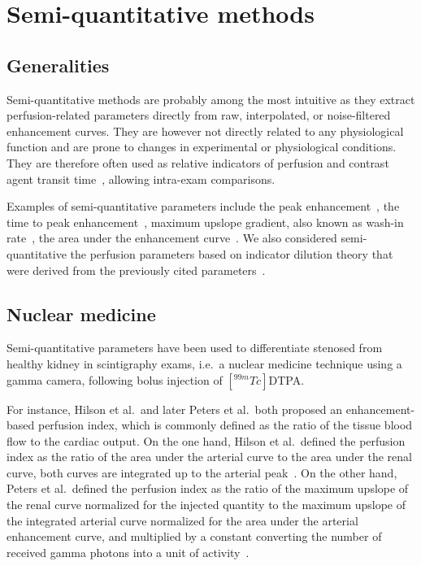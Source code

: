 \section{Semi-quantitative methods}
\label{sec:SQMethods}
\subsection{Generalities}
Semi-quantitative methods are probably among the most intuitive as they extract perfusion-related parameters directly from raw, interpolated, or noise-filtered enhancement curves.
They are however not directly related to any physiological function and are prone to changes in experimental or physiological conditions.
They are therefore often used as relative indicators of perfusion and contrast agent transit time~\cite{Miles:1991et}, allowing intra-exam comparisons.

Examples of semi-quantitative parameters include the peak enhancement~\cite{Norman:1978ji,Nally:1985te,Pettersson:1987ft,Erlemann:1989ib}, the time to peak enhancement~\cite{Norman:1978ji,Erlemann:1989ib,Dietrich:2012kw}, maximum upslope gradient, also known as wash-in rate~\cite{Nally:1985te,Erlemann:1989ib}, the area under the enhancement curve~\cite{Dietrich:2012kw}. 
We also considered semi-quantitative the perfusion parameters based on indicator dilution theory that were derived from the previously cited parameters~\cite{Hilson:1978us,Peters:1987fa,Peters:1987vx,Miles:1991et,Miles:1991ei,Miles:1993cq,Blomley:1995vs,Koenig:1998ir}.

\subsection{Nuclear medicine}
\label{sec:SQNM}
Semi-quantitative parameters have been used to differentiate stenosed from healthy kidney in scintigraphy exams, i.e.~a nuclear medicine technique using a gamma camera, following bolus injection of $\left[^{99m}Tc\right]$DTPA.

For instance, Hilson et al.~and later Peters et al.~both proposed an enhancement-based perfusion index, which is commonly defined as the ratio of the tissue blood flow to the cardiac output. 
On the one hand, Hilson et al.~defined the perfusion index as the ratio of the area under the arterial curve to the area under the renal curve, both curves are integrated up to the arterial peak~\cite{Hilson:1978us}.
On the other hand, Peters et al.~defined the perfusion index as the ratio of the maximum upslope of the renal curve normalized for the injected quantity to the maximum upslope of the integrated arterial curve normalized for the area under the arterial enhancement curve, and multiplied by a constant converting the number of received gamma photons into a unit of activity~\cite{Peters:1987fa,Peters:1987vx}. 

